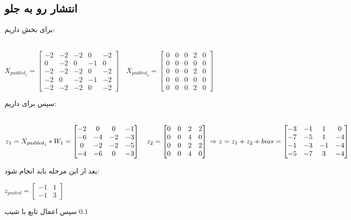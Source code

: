 \subsection{انتشار رو به جلو}
برای بخش 
داریم:
\begin{latin}
	~\\
	$
		X_{{padded}_1} = \begin{bmatrix}
-2 & -2 & -2 & 0 & -2 \\
0 & -2 & 0 & -1 & 0 \\
-2 & -2 & -2 & 0 & -2 \\
-2 & 0 & -2 & -1 & -2 \\
-2 & -2 & -2 & 0 & -2 
	\end{bmatrix}
	\quad 
	X_{{padded}_2} = \begin{bmatrix}
		0 & 0 & 0 & 2& 0 \\
		0 & 0 & 0 & 0& 0 \\
		0 & 0 & 0 & 2& 0 \\
		0 & 0 & 0 & 0& 0 \\
		0 & 0 & 0 & 2& 0 
	\end{bmatrix}
	$
\end{latin}
سپس برای 
داریم:
\begin{latin}
	~\\
	$
	z_1 = X_{{padded}_1} * W_1 = \begin{bmatrix}
		-2 & 0 & 0 & -1 \\
		-6 & -4 & -2 & -3 \\
		0 & -2 & -2  & -5 \\
		-4 & -6 & 0 & -3
	\end{bmatrix}
	\quad 
	z_2 = \begin{bmatrix}
		0 & 0 & 2 & 2 \\
		0 & 0 & 4 & 0 \\
		0 & 0 &  2 & 2 \\
		0 & 0 & 4 & 0
	\end{bmatrix}
	\\
	\Rightarrow
	z = z_1 + z_2 + bias = \begin{bmatrix}
		-3 & -1 & 1 & 0  \\
		-7 & -5 & 1 & -4 \\
		-1 & -3 & -1  & -4 \\
		-5 & -7 & 3 & -4
	\end{bmatrix}
	$
\end{latin}
بعد از این مرحله باید 
انجام شود:
\begin{latin}
	$
	z_{pooled} = \begin{bmatrix}
		-1 & 1 \\
		-1 & 3
	\end{bmatrix}
$
\end{latin}
سپس اعمال تابع 
با شیب 
$0.1$

